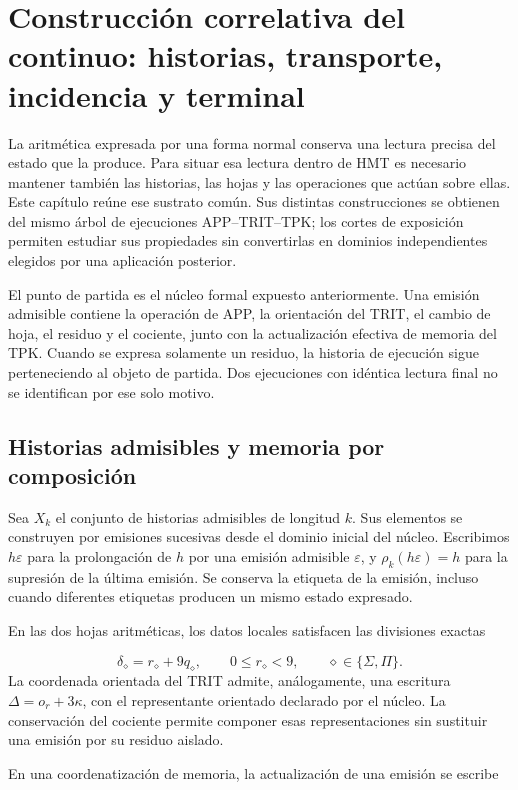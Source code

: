 \section{Construcción correlativa del continuo: historias, transporte, incidencia y terminal}
\label{lectura:manuscrito-05}
La aritmética expresada por una forma normal conserva una lectura precisa del estado que la produce. Para situar esa lectura dentro de HMT es necesario mantener también las historias, las hojas y las operaciones que actúan sobre ellas. Este capítulo reúne ese sustrato común. Sus distintas construcciones se obtienen del mismo árbol de ejecuciones APP–TRIT–TPK; los cortes de exposición permiten estudiar sus propiedades sin convertirlas en dominios independientes elegidos por una aplicación posterior.

El punto de partida es el núcleo formal expuesto anteriormente. Una emisión admisible contiene la operación de APP, la orientación del TRIT, el cambio de hoja, el residuo y el cociente, junto con la actualización efectiva de memoria del TPK. Cuando se expresa solamente un residuo, la historia de ejecución sigue perteneciendo al objeto de partida. Dos ejecuciones con idéntica lectura final no se identifican por ese solo motivo.

\subsection{Historias admisibles y memoria por composición}
Sea \(X_k\) el conjunto de historias admisibles de longitud \(k\). Sus elementos se construyen por emisiones sucesivas desde el dominio inicial del núcleo. Escribimos \(h\varepsilon\) para la prolongación de \(h\) por una emisión admisible \(\varepsilon\), y \(\rho_k(h\varepsilon)=h\) para la supresión de la última emisión. Se conserva la etiqueta de la emisión, incluso cuando diferentes etiquetas producen un mismo estado expresado.

En las dos hojas aritméticas, los datos locales satisfacen las divisiones exactas

\[
\delta_\diamond=r_\diamond+9q_\diamond,
\qquad 0\leq r_\diamond<9,
\qquad \diamond\in\{\Sigma,\Pi\}.
\]
La coordenada orientada del TRIT admite, análogamente, una escritura \(\Delta=o_r+3\kappa\), con el representante orientado declarado por el núcleo. La conservación del cociente permite componer esas representaciones sin sustituir una emisión por su residuo aislado.

En una coordenatización de memoria, la actualización de una emisión se escribe

